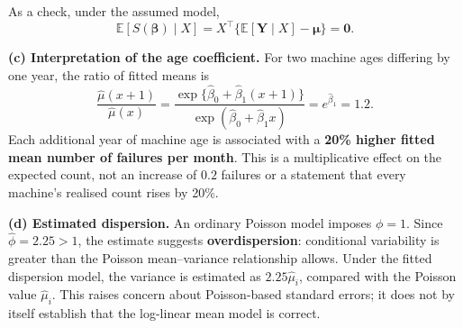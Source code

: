 \documentclass[11pt,a4paper]{article}
\newcommand{\given}{\mathrel{|}}
\newcommand{\E}{\mathbb{E}}
\begin{document}
As a check, under the assumed model,
\[
\E[S(\boldsymbol\beta)\given X]
=X^\top\{\E[\mathbf Y\given X]-\boldsymbol\mu\}
=\mathbf0.
\]

\textbf{(c) Interpretation of the age coefficient.}
For two machine ages differing by one year, the ratio of fitted means is
\[
\frac{\hat\mu(x+1)}{\hat\mu(x)}
=\frac{\exp\{\hat\beta_0+\hat\beta_1(x+1)\}}
       {\exp(\hat\beta_0+\hat\beta_1x)}
=e^{\hat\beta_1}=1.2.
\]
Each additional year of machine age is associated with a \textbf{20\%
higher fitted mean number of failures per month}. This is a
multiplicative effect on the expected count, not an increase of $0.2$
failures or a statement that every machine's realised count rises by 20\%.

\textbf{(d) Estimated dispersion.}
An ordinary Poisson model imposes $\phi=1$. Since $\hat\phi=2.25>1$,
the estimate suggests \textbf{overdispersion}: conditional variability
is greater than the Poisson mean--variance relationship allows. Under
the fitted dispersion model, the variance is estimated as
$2.25\hat\mu_i$, compared with the Poisson value $\hat\mu_i$.
This raises concern about Poisson-based standard errors; it does not by
itself establish that the log-linear mean model is correct.
\end{document}
